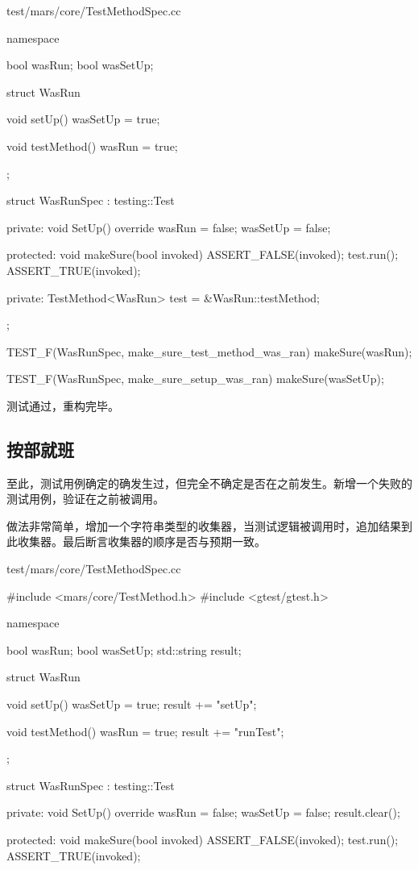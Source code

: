 \begin{content}
\begin{nodiff}{test/mars/core/TestMethodSpec.cc}
\begin{c++}
namespace {
  bool wasRun;
  bool wasSetUp;

  struct WasRun {
    void setUp() {
      wasSetUp = true;
    }

    void testMethod() {
      wasRun = true;
    }
  };

  struct WasRunSpec : testing::Test {
  private:
    void SetUp() override {
      wasRun = false;
      wasSetUp = false;
    }

  protected:
    void makeSure(bool invoked) {
      ASSERT_FALSE(invoked);
      test.run();
      ASSERT_TRUE(invoked);      
    }

  private:
    TestMethod<WasRun> test = &WasRun::testMethod;
  };
}

TEST_F(WasRunSpec, make_sure_test_method_was_ran) {
  makeSure(wasRun);
}

TEST_F(WasRunSpec, make_sure_setup_was_ran) {
  makeSure(wasSetUp);
}
\end{c++}
\end{nodiff}

测试通过，重构完毕。

\subsection{按部就班}

至此，测试用例确定的确发生过，但完全不确定是否在之前发生。新增一个失败的测试用例，验证在之前被调用。

做法非常简单，增加一个字符串类型的收集器，当测试逻辑被调用时，追加结果到此收集器。最后断言收集器的顺序是否与预期一致。

\begin{nodiff}{test/mars/core/TestMethodSpec.cc}
\begin{c++}
#include <mars/core/TestMethod.h>
#include <gtest/gtest.h>

namespace {
  bool wasRun;
  bool wasSetUp;
  std::string result;

  struct WasRun {
    void setUp() {
      wasSetUp = true;
      result += "setUp";
    }

    void testMethod() {
      wasRun = true;
      result += "runTest";
    }
  };

  struct WasRunSpec : testing::Test {
  private:
    void SetUp() override {
      wasRun = false;
      wasSetUp = false;
      result.clear();
    }

  protected:
    void makeSure(bool invoked) {
      ASSERT_FALSE(invoked);
      test.run();
      ASSERT_TRUE(invoked);      
    }

}}
\end{c++}
\end{nodiff}
\end{content}
